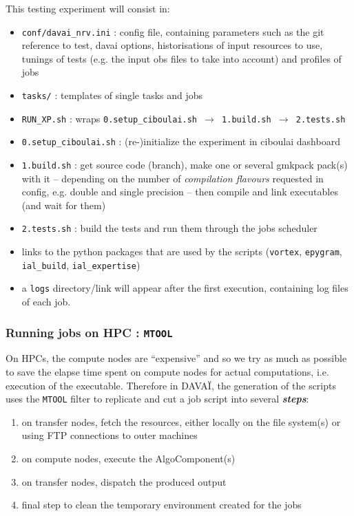 \documentclass[a4paper,10pt,twoside]{article}
\begin{document}
\noindent This testing experiment will consist in:
\begin{itemize}
 \item \texttt{conf/davai\_nrv.ini} : config file, containing parameters such as the git reference to test, davai options, historisations of input resources to use, tunings of tests (e.g. the input obs files to take into account) and profiles of jobs
 \item \texttt{tasks/} : templates of single tasks and jobs
 \item \texttt{RUN\_XP.sh} : wraps \texttt{0.setup\_ciboulai.sh $\rightarrow$ 1.build.sh $\rightarrow$ 2.tests.sh}
 \item \texttt{0.setup\_ciboulai.sh} : (re-)initialize the experiment in ciboulai dashboard
 \item \texttt{1.build.sh} : get source code (branch), make one or several gmkpack pack(s) with it -- depending on the number of \textit{compilation flavours} requested in config, e.g. double and single precision -- then compile and link executables (and wait for them)
 \item \texttt{2.tests.sh} : build the tests and run them through the jobs scheduler
 \item links to the python packages that are used by the scripts (\texttt{vortex}, \texttt{epygram}, \texttt{ial\_build}, \texttt{ial\_expertise})
 \item a \texttt{logs} directory/link will appear after the first execution, containing log files of each job.
\end{itemize}


\subsubsection{Running jobs on HPC : \texttt{MTOOL}}
On HPCs, the compute nodes are ``expensive'' and so we try as much as possible to save the elapse time spent on compute nodes for actual computations, i.e. execution of the executable.
Therefore in DAVAÏ, the generation of the scripts uses the \texttt{MTOOL} filter to replicate and cut a job script into several \textit{\textbf{steps}}:
\begin{enumerate}[label=(step.0\arabic*)]
 \item on transfer nodes, fetch the resources, either locally on the file system(s) or using FTP connections to outer machines
 \item on compute nodes, execute the AlgoComponent(s)
 \item on transfer nodes, dispatch the produced output
 \item final step to clean the temporary environment created for the jobs
\end{enumerate}
\end{document}
